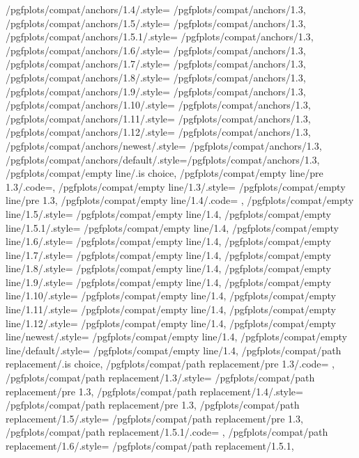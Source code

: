{	/pgfplots/compat/anchors/1.4/.style= 	{/pgfplots/compat/anchors/1.3},%
	/pgfplots/compat/anchors/1.5/.style= 	{/pgfplots/compat/anchors/1.3},%
	/pgfplots/compat/anchors/1.5.1/.style= 	{/pgfplots/compat/anchors/1.3},%
	/pgfplots/compat/anchors/1.6/.style= 	{/pgfplots/compat/anchors/1.3},%
	/pgfplots/compat/anchors/1.7/.style= 	{/pgfplots/compat/anchors/1.3},%
	/pgfplots/compat/anchors/1.8/.style= 	{/pgfplots/compat/anchors/1.3},%
	/pgfplots/compat/anchors/1.9/.style= 	{/pgfplots/compat/anchors/1.3},%
	/pgfplots/compat/anchors/1.10/.style= 	{/pgfplots/compat/anchors/1.3},%
	/pgfplots/compat/anchors/1.11/.style= 	{/pgfplots/compat/anchors/1.3},%
	/pgfplots/compat/anchors/1.12/.style= 	{/pgfplots/compat/anchors/1.3},%
	/pgfplots/compat/anchors/newest/.style= {/pgfplots/compat/anchors/1.3},%
	/pgfplots/compat/anchors/default/.style={/pgfplots/compat/anchors/1.3},%
	/pgfplots/compat/empty line/.is choice,
	/pgfplots/compat/empty line/pre 1.3/.code={\pgfplots@emptyline@compattrue},%
	/pgfplots/compat/empty line/1.3/.style= {/pgfplots/compat/empty line/pre 1.3},%
	/pgfplots/compat/empty line/1.4/.code= 	{\pgfplots@emptyline@compatfalse},%
	/pgfplots/compat/empty line/1.5/.style= 	{/pgfplots/compat/empty line/1.4},%
	/pgfplots/compat/empty line/1.5.1/.style= 	{/pgfplots/compat/empty line/1.4},%
	/pgfplots/compat/empty line/1.6/.style= 	{/pgfplots/compat/empty line/1.4},%
	/pgfplots/compat/empty line/1.7/.style= 	{/pgfplots/compat/empty line/1.4},%
	/pgfplots/compat/empty line/1.8/.style= 	{/pgfplots/compat/empty line/1.4},%
	/pgfplots/compat/empty line/1.9/.style= 	{/pgfplots/compat/empty line/1.4},%
	/pgfplots/compat/empty line/1.10/.style= 	{/pgfplots/compat/empty line/1.4},%
	/pgfplots/compat/empty line/1.11/.style= 	{/pgfplots/compat/empty line/1.4},%
	/pgfplots/compat/empty line/1.12/.style= 	{/pgfplots/compat/empty line/1.4},%
	/pgfplots/compat/empty line/newest/.style=	{/pgfplots/compat/empty line/1.4},%
	/pgfplots/compat/empty line/default/.style=	{/pgfplots/compat/empty line/1.4},%
	/pgfplots/compat/path replacement/.is choice,
	/pgfplots/compat/path replacement/pre 1.3/.code= {\pgfplots@path@replace@ellipsefalse},
	/pgfplots/compat/path replacement/1.3/.style=    {/pgfplots/compat/path replacement/pre 1.3},%
	/pgfplots/compat/path replacement/1.4/.style=  	 {/pgfplots/compat/path replacement/pre 1.3},
	/pgfplots/compat/path replacement/1.5/.style=    {/pgfplots/compat/path replacement/pre 1.3},%
	/pgfplots/compat/path replacement/1.5.1/.code=   {\pgfplots@path@replace@ellipsetrue},%
	/pgfplots/compat/path replacement/1.6/.style=   	{/pgfplots/compat/path replacement/1.5.1},
}
